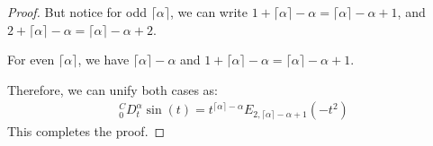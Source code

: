 \documentclass{article}
\begin{document}
\begin{proof}
But notice for odd $\lceil \alpha \rceil$, we can write $1+\lceil \alpha \rceil - \alpha = \lceil \alpha \rceil - \alpha + 1$, and $2+\lceil \alpha \rceil - \alpha = \lceil \alpha \rceil - \alpha + 2$. 

For even $\lceil \alpha \rceil$, we have $\lceil \alpha \rceil - \alpha$ and $1+\lceil \alpha \rceil - \alpha = \lceil \alpha \rceil - \alpha + 1$.

Therefore, we can unify both cases as:
\begin{align}
_0^CD_t^\alpha \sin(t) = t^{\lceil \alpha \rceil - \alpha} E_{2,\lceil \alpha \rceil - \alpha + 1}(-t^2)
\end{align}
This completes the proof.
\end{proof}
\end{document}
